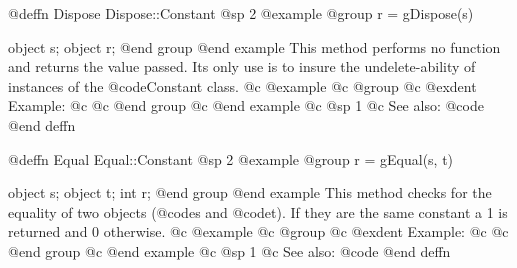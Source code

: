 @deffn {Dispose} Dispose::Constant
@sp 2
@example
@group
r = gDispose(s)

object  s;
object  r;
@end group
@end example
This method performs no function and returns the value passed.  Its only
use is to insure the undelete-ability of instances of the
@code{Constant} class.
@c @example
@c @group
@c @exdent Example:
@c 
@c @end group
@c @end example
@c @sp 1
@c See also:  @code{}
@end deffn








@deffn {Equal} Equal::Constant
@sp 2
@example
@group
r = gEqual(s, t)

object  s;
object  t;
int     r;
@end group
@end example
This method checks for the equality of two objects (@code{s} and @code{t}).
If they are the same constant a 1 is returned and 0 otherwise.
@c @example
@c @group
@c @exdent Example:
@c 
@c @end group
@c @end example
@c @sp 1
@c See also:  @code{}
@end deffn



